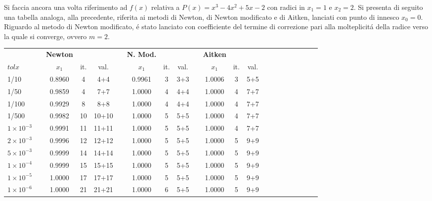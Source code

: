 \begin{center}
\footnotesize\noindent{}\end{center}

\noindent Si faccia ancora una volta riferimento ad \(f(x)\) relativa a \(P(x)=x^3 - 4x^2 + 5x - 2\) con radici in \(x_1=1\) e \(x_2=2\). Si presenta di seguito una tabella analoga, alla precedente, riferita ai metodi di Newton, di Newton modificato e di Aitken, lanciati con punto di innesco \(x_0 = 0\). Riguardo al metodo di Newton modificato, \'e stato lanciato con coefficiente del termine di correzione pari alla molteplicit\'a della radice verso la quale si converge, ovvero \(m = 2\).\\

\small\begin{tabular}{l*{20}{c}}
 & \vline& \textbf{Newton} & & & \vline& \textbf{N. Mod.} & & & \vline& \textbf{Aitken} \\
 \(tolx\) & \vline& \(x_1\)   & it. & val. & \vline& \(x_1\)   & it. & val.  &\vline& \(x_1\)  & it.& val. \\
\hline
 1/10                   & \vline&  0.8960 & 4	& 4+4  & \vline& 0.9961 & 3 & 3+3 & \vline& 1.0006 & 3  & 5+5\\
 1/50                   & \vline&  0.9859 & 4	& 7+7  & \vline& 1.0000 & 4 & 4+4 & \vline& 1.0000 & 4  & 7+7\\
 1/100                   & \vline& 0.9929 & 8	& 8+8  & \vline& 1.0000 & 4 & 4+4 & \vline& 1.0000 & 4  & 7+7\\
 1/500                   & \vline& 0.9982 & 10	& 10+10& \vline& 1.0000 & 5 & 5+5 & \vline& 1.0000 & 4  & 7+7\\
 \(1 \times 10^{-3}\) & \vline&    0.9991 & 11	& 11+11& \vline& 1.0000 & 5 & 5+5 & \vline& 1.0000 & 4  & 7+7\\
 \(2 \times 10^{-3}\) & \vline&    0.9996 & 12	& 12+12& \vline& 1.0000 & 5 & 5+5 & \vline& 1.0000 & 5  & 9+9\\
 \(5 \times 10^{-3}\) & \vline&    0.9999 & 14	& 14+14& \vline& 1.0000 & 5 & 5+5 & \vline& 1.0000 & 5  & 9+9\\
 \(1 \times 10^{-4}\) & \vline&    0.9999 & 15	& 15+15& \vline& 1.0000 & 5 & 5+5 & \vline& 1.0000 & 5  & 9+9\\
 \(1 \times 10^{-5}\) & \vline&    1.0000 & 17	& 17+17& \vline& 1.0000 & 5 & 5+5 & \vline& 1.0000 & 5  & 9+9\\
 \(1 \times 10^{-6}\) & \vline&    1.0000 & 21 	& 21+21& \vline& 1.0000 & 6 & 5+5 & \vline& 1.0000 & 5  & 9+9\\
\end{tabular} \\
\\

